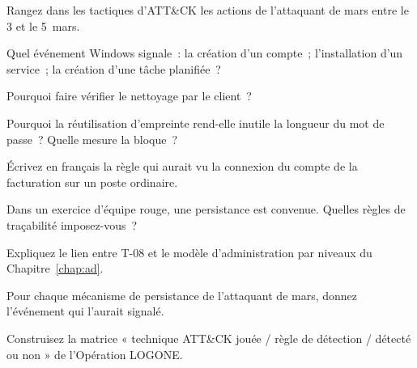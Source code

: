 \begin{boxexo}[title={\ding{45}\quad Exercice~12.1. Tactiques \niveaubase}]
Rangez dans les tactiques d'ATT\&CK les actions de l'attaquant de mars entre
le 3 et le 5~mars.
\end{boxexo}

\begin{boxexo}[title={\ding{45}\quad Exercice~12.2. Événements \niveaubase}]
Quel événement Windows signale~: la création d'un compte~; l'installation
d'un service~; la création d'une tâche planifiée~?
\end{boxexo}

\begin{boxexo}[title={\ding{45}\quad Exercice~12.3. Nettoyage \niveaubase}]
Pourquoi faire vérifier le nettoyage par le client~?
\end{boxexo}

\begin{boxexo}[title={\ding{45}\quad Exercice~12.4. Réutilisation d'empreinte \niveaumoyen}]
Pourquoi la réutilisation d'empreinte rend-elle inutile la longueur du mot
de passe~? Quelle mesure la bloque~?
\end{boxexo}

\begin{boxexo}[title={\ding{45}\quad Exercice~12.5. Une règle \niveaumoyen}]
Écrivez en français la règle qui aurait vu la connexion du compte de la
facturation sur un poste ordinaire.
\end{boxexo}

\begin{boxexo}[title={\ding{45}\quad Exercice~12.6. Persistance tracée \niveaumoyen}]
Dans un exercice d'équipe rouge, une persistance est convenue. Quelles
règles de traçabilité imposez-vous~?
\end{boxexo}

\begin{boxexo}[title={\ding{45}\quad Exercice~12.7. T-08 \niveaumoyen}]
Expliquez le lien entre T-08 et le modèle d'administration par niveaux du
Chapitre~\ref{chap:ad}.
\end{boxexo}

\begin{boxexo}[title={\ding{45}\quad Exercice~12.8. GAROUA rejoué \niveaumoyen}]
Pour chaque mécanisme de persistance de l'attaquant de mars, donnez
l'événement qui l'aurait signalé.
\end{boxexo}

\begin{boxexo}[title={\ding{45}\quad Exercice~12.9. Couverture \niveauexpert}]
Construisez la matrice « technique ATT\&CK jouée / règle de détection /
détecté ou non » de l'Opération LOGONE.
\end{boxexo}


